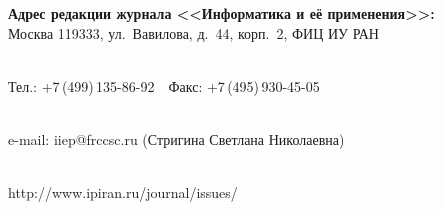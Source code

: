 {\begin{center}
\textbf{Адрес редакции журнала <<Информатика и её применения>>:} \\














Москва 119333, ул.~Вавилова, д.~44, корп.~2, ФИЦ ИУ РАН\\[-10pt]





\





Тел.: +7\,(499)\,135-86-92\ \ Факс:  +7\,(495)\,930-45-05\\[-10pt]





 \





e-mail:   {\sf iiep@frccsc.ru} (Стригина Светлана Николаевна)\\[-10pt]





\





{\sf http://www.ipiran.ru/journal/issues/}


\end{center}


}








\def\leftkol{Правила подготовки рукописей  для публикации в журнале


<<Информатика и её применения>>}





\def\rightkol{Правила подготовки рукописей  для публикации в журнале


<<Информатика и её применения>>}








\def\leftfootline{\small{\textbf{\thepage}


\hfill ИНФОРМАТИКА И ЕЁ ПРИМЕНЕНИЯ\ \ \ том\ 18\ \ \ выпуск\ 3\ \ \ 2024}


}%


 \def\rightfootline{\small{ИНФОРМАТИКА И ЕЁ ПРИМЕНЕНИЯ\ \ \ том\ 18\ \ \ выпуск\ 3\ \ \ 2024


\hfill \textbf{\thepage}}} 


